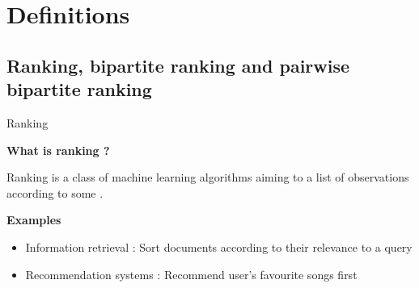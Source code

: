 \section{Definitions}
\subsection{Ranking, bipartite ranking and pairwise bipartite ranking}

\begin{frame}{Ranking}

    {\large\textbf{What is ranking ?}}
    
    Ranking is a class of machine learning algorithms aiming to  a list of observations according to some . 
    
    \vspace{0.3cm}
    
    {\large\textbf{Examples}}
    
    \begin{itemize}
        \item Information retrieval : Sort documents according to their relevance to a query
        \item Recommendation systems : Recommend user's favourite songs first
    \end{itemize}
\end{frame}


